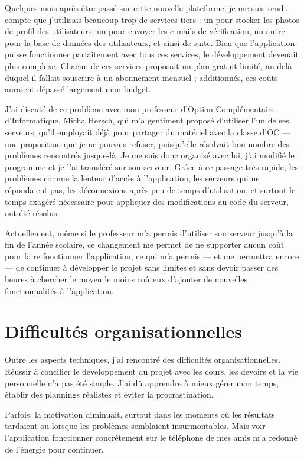 \documentclass[12pt]{report}
\begin{document}
	Quelques mois après être passé sur cette nouvelle plateforme, je me suis rendu compte que j’utilisais beaucoup trop de services tiers : un pour stocker les photos de profil des utilisateurs, un pour envoyer les e-mails de vérification, un autre pour la base de données des utilisateurs, et ainsi de suite. Bien que l’application puisse fonctionner parfaitement avec tous ces services, le développement devenait plus complexe. Chacun de ces services proposait un plan gratuit limité, au-delà duquel il fallait souscrire à un abonnement mensuel ; additionnés, ces coûts auraient dépassé largement mon budget.
	
	J’ai discuté de ce problème avec mon professeur d’Option Complémentaire d’Informatique, Micha Hersch, qui m’a gentiment proposé d’utiliser l’un de ses serveurs, qu’il employait déjà pour partager du matériel avec la classe d’OC — une proposition que je ne pouvais refuser, puisqu’elle résolvait bon nombre des problèmes rencontrés jusque-là. Je me suis donc organisé avec lui, j’ai modifié le programme et je l’ai transféré sur son serveur. Grâce à ce passage très rapide, les problèmes comme la lenteur d’accès à l’application, les serveurs qui ne répondaient pas, les déconnexions après peu de temps d’utilisation, et surtout le temps exagéré nécessaire pour appliquer des modifications au code du serveur, ont été résolus.
	
	Actuellement, même si le professeur m’a permis d’utiliser son serveur jusqu’à la fin de l’année scolaire, ce changement me permet de ne supporter aucun coût pour faire fonctionner l’application, ce qui m’a permis — et me permettra encore — de continuer à développer le projet sans limites et sans devoir passer des heures à chercher le moyen le moins coûteux d’ajouter de nouvelles fonctionnalités à l’application.
	
	\section{Difficultés organisationnelles}
	
	Outre les aspects techniques, j’ai rencontré des difficultés organisationnelles. Réussir à concilier le développement du projet avec les cours, les devoirs et la vie personnelle n’a pas été simple. J’ai dû apprendre à mieux gérer mon temps, établir des plannings réalistes et éviter la procrastination.
	
	Parfois, la motivation diminuait, surtout dans les moments où les résultats tardaient ou lorsque les problèmes semblaient insurmontables. Mais voir l’application fonctionner concrètement sur le téléphone de mes amis m’a redonné de l’énergie pour continuer.
	
\end{document}
